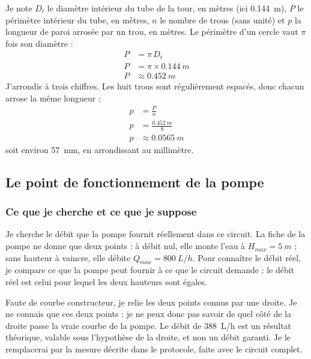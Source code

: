 \begin{demonstration}
Je note $D_t$ le diamètre intérieur du tube de la tour, en mètres (ici \qty{0,144}{m}), $P$ le périmètre intérieur du tube, en mètres, $n$ le nombre de trous (sans unité) et $p$ la longueur de paroi arrosée par un trou, en mètres. Le périmètre d'un cercle vaut $\pi$ fois son diamètre :
\begin{align*}
P &= \pi\, D_t\\
P &= \pi \times \qty{0,144}{m}\\
P &\approx \qty{0,452}{m}
\end{align*}
J'arrondis à trois chiffres. Les huit trous sont régulièrement espacés, donc chacun arrose la même longueur :
\begin{align*}
p &= \frac{P}{n}\\
p &= \frac{\qty{0,452}{m}}{8}\\
p &\approx \qty{0,0565}{m}
\end{align*}
soit environ \qty{57}{mm}, en arrondissant au millimètre.
\end{demonstration}

\subsection{Le point de fonctionnement de la pompe}

\subsubsection*{Ce que je cherche et ce que je suppose}

Je cherche le débit que la pompe fournit réellement dans ce circuit. La fiche de la pompe ne donne que deux points : à débit nul, elle monte l'eau à $H_{max} = \qty{5}{m}$ ; sans hauteur à vaincre, elle débite $Q_{max} = \qty{800}{L/h}$. Pour connaître le débit réel, je compare ce que la pompe peut fournir à ce que le circuit demande : le débit réel est celui pour lequel les deux hauteurs sont égales.

Faute de courbe constructeur, je relie les deux points connus par une droite. Je ne connais que ces deux points : je ne peux donc pas savoir de quel côté de la droite passe la vraie courbe de la pompe. Le débit de \qty{388}{L/h} est un résultat théorique, valable sous l'hypothèse de la droite, et non un débit garanti. Je le remplacerai par la mesure décrite dans le protocole, faite avec le circuit complet.

